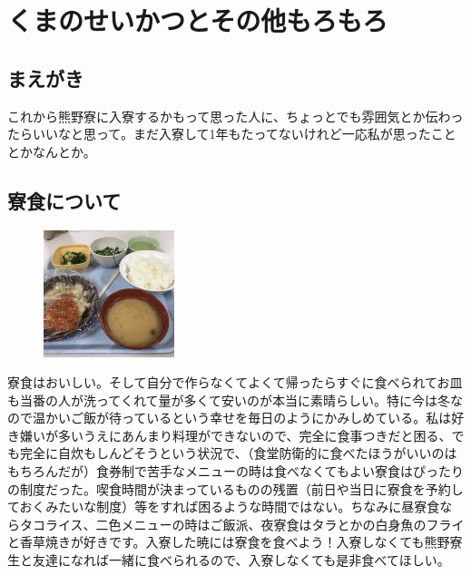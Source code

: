 \section{くまのせいかつとその他もろもろ}\label{sec:kumanoseikatu}


\subsection{まえがき}
これから熊野寮に入寮するかもって思った人に、ちょっとでも雰囲気とか伝わったらいいなと思って。まだ入寮して1年もたってないけれど一応私が思ったこととかなんとか。

\subsection{寮食について}
\begin{figure}
  \centering
  \includegraphics[width=3.8cm]{gazo/hanbagu.jpg}
\end{figure}



寮食はおいしい。そして自分で作らなくてよくて帰ったらすぐに食べられてお皿も当番の人が洗ってくれて量が多くて安いのが本当に素晴らしい。特に今は冬なので温かいご飯が待っているという幸せを毎日のようにかみしめている。私は好き嫌いが多いうえにあんまり料理ができないので、完全に食事つきだと困る、でも完全に自炊もしんどそうという状況で、（食堂防衛的に食べたほうがいいのはもちろんだが）食券制で苦手なメニューの時は食べなくてもよい寮食はぴったりの制度だった。喫食時間が決まっているものの残置（前日や当日に寮食を予約しておくみたいな制度）等をすれば困るような時間ではない。ちなみに昼寮食ならタコライス、二色メニューの時はご飯派、夜寮食はタラとかの白身魚のフライと香草焼きが好きです。入寮した暁には寮食を食べよう！入寮しなくても熊野寮生と友達になれば一緒に食べられるので、入寮しなくても是非食べてほしい。



